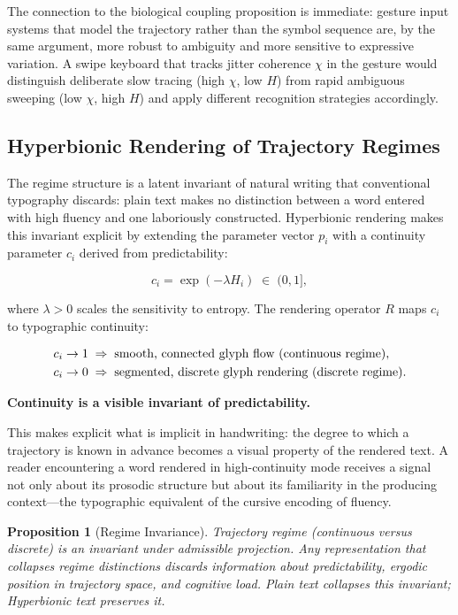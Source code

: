 \documentclass[12pt, a4paper]{article}
\newcommand{\hyperstrong}[1]{\textbf{\Large #1}}
\newtheorem{proposition}{Proposition}
\begin{document}
The connection to the biological coupling proposition is immediate: gesture input systems that model the trajectory rather than the symbol sequence are, by the same argument, more robust to ambiguity and more sensitive to expressive variation. A swipe keyboard that tracks jitter coherence $\chi$ in the gesture would distinguish deliberate slow tracing (high $\chi$, low $H$) from rapid ambiguous sweeping (low $\chi$, high $H$) and apply different recognition strategies accordingly.

\subsection{Hyperbionic Rendering of Trajectory Regimes}

The regime structure is a latent invariant of natural writing that conventional typography discards: plain text makes no distinction between a word entered with high fluency and one laboriously constructed. Hyperbionic rendering makes this invariant explicit by extending the parameter vector $p_i$ with a continuity parameter $c_i$ derived from predictability:

\begin{equation}
c_i = \exp(-\lambda H_i) \;\in\; (0, 1],
\label{eq:ci}
\end{equation}

where $\lambda > 0$ scales the sensitivity to entropy. The rendering operator $R$ maps $c_i$ to typographic continuity:

\begin{align}
c_i \to 1 &\;\Rightarrow\; \text{smooth, connected glyph flow (continuous regime)}, \notag\\
c_i \to 0 &\;\Rightarrow\; \text{segmented, discrete glyph rendering (discrete regime)}.
\label{eq:rendering_regime}
\end{align}

\begin{center}
\hyperstrong{Continuity is a visible invariant of predictability.}
\end{center}

This makes explicit what is implicit in handwriting: the degree to which a trajectory is known in advance becomes a visual property of the rendered text. A reader encountering a word rendered in high-continuity mode receives a signal not only about its prosodic structure but about its familiarity in the producing context---the typographic equivalent of the cursive encoding of fluency.

\begin{proposition}[Regime Invariance]
Trajectory regime (continuous versus discrete) is an invariant under admissible projection. Any representation that collapses regime distinctions discards information about predictability, ergodic position in trajectory space, and cognitive load. Plain text collapses this invariant; Hyperbionic text preserves it.
\end{proposition}
\end{document}
